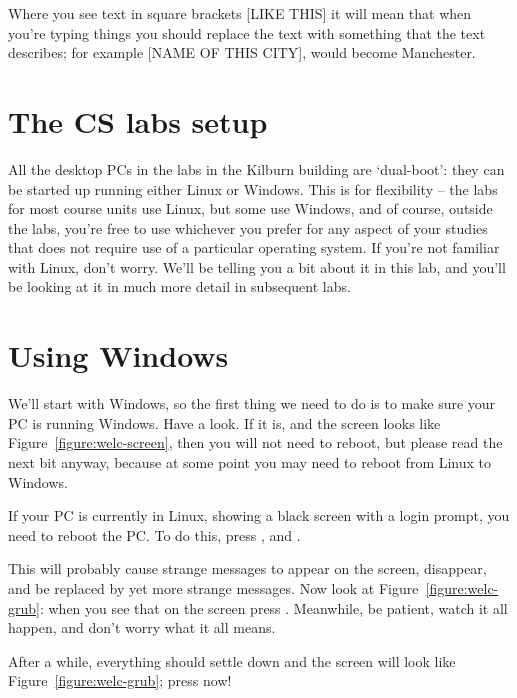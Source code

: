 Where you see text in square brackets [LIKE THIS] it will mean that when you're typing things you should replace the text with something that the text describes; for example [NAME OF THIS CITY], would become Manchester.

\section{The CS labs setup}

All the desktop PCs in the labs in the Kilburn building are
`dual-boot': they can be started up running either Linux or
Windows. This is for flexibility -- the labs for most course units  use
Linux, but some use Windows, and of course, outside the labs, you're free to use
whichever you prefer for any aspect of your studies that does not require use of a particular operating system. If you're not
familiar with Linux, don't worry. We'll be telling you a bit about it
in this lab, and you'll be looking at it in much more detail in subsequent labs.

\section{Using Windows}
\label{sec:using-windows}

We'll start with Windows, so the first thing we need to do is to make
sure your PC is running Windows. Have a look. If it is, and the screen
looks like Figure~\ref{figure:welc-screen}, then you will not need to
reboot, but please read the next bit anyway, because at some point you
may need to reboot from Linux to Windows.

If your PC is currently in Linux, showing a black screen with a login prompt,  you need to reboot the PC. To do
this, press ,  and .

This will probably cause strange messages to appear on the screen,
disappear, and be replaced by yet more strange messages. Now look at Figure~\ref{figure:welc-grub}: when you see that on the screen press . Meanwhile, be patient,
watch it all happen, and don't worry what it all means.

After a while,
everything should settle down and the screen will look like
Figure~\ref{figure:welc-grub}; press  now!


